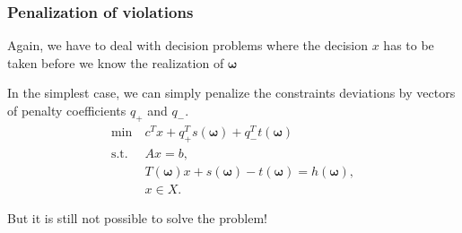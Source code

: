 \documentclass{beamer}
\def\bomega{\boldsymbol\omega}
\begin{document}
\begin{frame}
	\frametitle{Penalization of violations}
	
	Again, we have to deal with decision problems where the decision $x$ has to be taken before we know the realization of $\bomega$
	


\mbox{}
	
	In the simplest case, we can simply penalize the constraints deviations by vectors of penalty coefficients $q_+$ and $q_-$.
	\begin{align*}
	\min\ & c^Tx+q^T_+s(\bomega)+q^T_-t(\bomega) \\
	\mbox{s.t. } & Ax = b, \\
	& T(\bomega)x + s(\bomega)-t(\bomega) = h(\bomega), \\
	& x \in X.
	\end{align*}
	
	\mbox{}
	
	But it is still not possible to solve the problem!
	
\end{frame}
\end{document}
